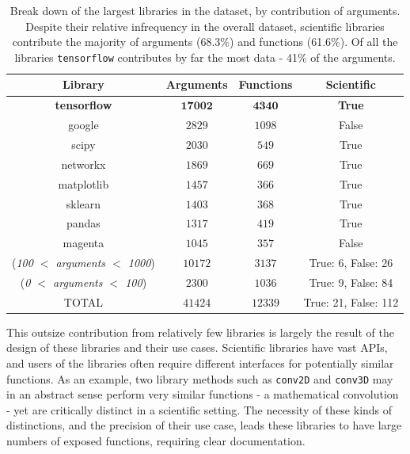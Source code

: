 \begin{table}[h!]
    \begin{center}
    \begin{tabular}{c | c | c | c}
        Library      & Arguments     & Functions  & Scientific \\
        \hline
        \textbf{tensorflow}   & $ \mathbf{17002} $     & $ \mathbf{4340} $ & \textbf{True} \\
        google   & $ 2829 $      & $ 1098 $ & False \\
        scipy    & $ 2030 $      & $ 549 $ & True \\
        networkx     & $ 1869 $      & $ 669 $ & True \\
        matplotlib   & $ 1457 $      & $ 366 $ & True \\
        sklearn      & $ 1403 $      & $ 368 $ & True \\
        pandas   & $ 1317 $      & $ 419 $ & True \\
        magenta      & $ 1045 $      & $ 357 $ & False \\
        (\textit{100 $<$ arguments $<$ 1000})   & $ 10172 $     & $ 3137 $ & True: 6, False: 26 \\
        (\textit{0 $<$ arguments $<$ 100})      & $ 2300 $      & $ 1036 $ & True: 9, False: 84 \\
        \hline
        \hline
        TOTAL    & $ 41424 $     & $ 12339 $ & True: 21, False: 112 \\
    \end{tabular}
    \caption {Break down of the largest libraries in the dataset, by contribution of arguments. Despite their relative infrequency in the overall dataset, scientific libraries contribute the majority of arguments (68.3\%) and functions (61.6\%). Of all the libraries \texttt{tensorflow} contributes by far the most data - 41\% of the arguments.}
    \label{table:breakdown_by_library}
    \end{center}
\end{table}



This outsize contribution from relatively few libraries is largely the result of the design of these libraries and their use cases. 
Scientific libraries have vast APIs, and users of the libraries often require different interfaces for potentially similar functions. 
As an example, two library methods such as \texttt{conv2D} and \texttt{conv3D} may in an abstract sense perform very similar functions - a mathematical convolution - yet are critically distinct in a scientific setting.
The necessity of these kinds of distinctions, and the precision of their use case, leads these libraries to have large numbers of exposed functions, requiring clear documentation.

